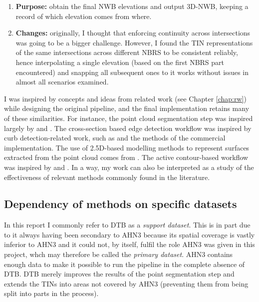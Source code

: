\begin{enumerate}
\begin{enumerate}
\begin{enumerate}
        \end{enumerate}
        \item \textbf{Purpose:} obtain the final NWB elevations and output 3D-NWB, keeping a record of which elevation comes from where.
        \item \textbf{Changes:} originally, I thought that enforcing continuity across intersections was going to be a bigger challenge. However, I found the TIN representations of the same intersections across different NBRS to be consistent reliably, hence interpolating a single elevation (based on the first NBRS part encountered) and snapping all subsequent ones to it works without issues in almost all scenarios examined.
    \end{enumerate}
\end{enumerate}

I was inspired by concepts and ideas from related work (see Chapter \ref{chap:rw}) while designing the original pipeline, and the final implementation retains many of these similarities. For instance, the point cloud segmentation step was inspired largely by \cite{oudeElberink_vosselman_2009} and \cite{boyko_funkhauser_2011}. The cross-section based edge detection workflow was inspired by curb detection-related work, such as \cite{yang_etal_2013} and the methods of the commercial implementation. The use of 2.5D-based modelling methods to represent surfaces extracted from the point cloud comes from \cite{oudeElberink_vosselman_2006}. The active contour-based workflow was inspired by \cite{boyko_funkhauser_2011} and \cite{gopfert_etal_2011}. In a way, my work can also be interpreted as a study of the effectiveness of relevant methods commonly found in the literature.

\subsection{Dependency of methods on specific datasets}
\label{sub:m_generalisation}

In this report I commonly refer to DTB as a \textit{support dataset}. This is in part due to it always having been secondary to AHN3 because its spatial coverage is vastly inferior to AHN3 and it could not, by itself, fulfil the role AHN3 was given in this project, whch may therefore be called the \textit{primary dataset}. AHN3 contains enough data to make it possible to run the pipeline in the complete absence of DTB. DTB merely improves the results of the point segmentation step and extends the TINs into areas not covered by AHN3 (preventing them from being split into parts in the process).

